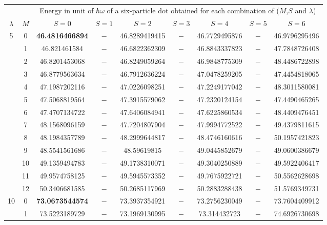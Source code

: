 \begin{table}[ht]
\centering      %
{\scriptsize
\begin{tabular}{c|c|c|c|c|c|c|c|c}  %
\toprule[1pt]
\multicolumn{1}{c|}{ } & \multicolumn{1}{c|}{ } &\multicolumn{7}{c}{Energy in unit of $\hbar \omega$ of a six-particle dot obtained for each combination of ($M$,$S$ and $\lambda$)} \\
$\lambda$ & $M$ & $S=0$& $S=1$ & $S=2$ & $S=3$ & $S=4$ & $S=5$ & $S=6$  \\
\hline                    %
\hline                    %
\multirow{13}{*}{5} & 0 & \textbf{46.4816466894}& $-$& 46.8289419415& $-$& 46.7729495876& $-$& 46.9796295496\\ 
& 1 & 46.821461584& $-$& 46.6822362309& $-$& 46.8843337823& $-$& 47.7848726408\\ 
& 2 & 46.8201453068& $-$& 46.8249059264& $-$& 46.9848775309& $-$& 48.4486722898\\ 
& 3 & 46.8779563634& $-$& 46.7912636224& $-$& 47.0478259205& $-$& 47.4454818065\\ 
& 4 & 47.1987202116& $-$& 47.0226098251& $-$& 47.2249177042& $-$& 48.3011580081\\ 
& 5 & 47.5068819564& $-$& 47.3915579062& $-$& 47.2320124154& $-$& 47.4490465265\\ 
& 6 & 47.4707134722& $-$& 47.6406084941& $-$& 47.6225860534& $-$& 48.4409476451\\ 
& 7 & 48.1568096159& $-$& 47.7204807904& $-$& 47.9994772522& $-$& 49.4379811615\\ 
& 8 & 48.1984357789& $-$& 48.2999644817& $-$& 48.4746160616& $-$& 50.1957421823\\ 
& 9 & 48.5541561686& $-$& 48.59619815& $-$& 49.0445852679& $-$& 49.0600386679\\ 
& 10 & 49.1359494783& $-$& 49.1738310071& $-$& 49.3040250889& $-$& 49.5922406417\\ 
& 11 & 49.9574758125& $-$& 49.5945573352& $-$& 49.7675922721& $-$& 50.5562628698\\ 
& 12 & 50.3406681585& $-$& 50.2685117969& $-$& 50.2883288438& $-$& 51.5769349731\\ 
\hline                    %
\multirow{13}{*}{10} & 0 & \textbf{73.0673544574}& $-$& 73.3937354921& $-$& 73.2756230049& $-$& 73.7604409912\\ 
& 1 & 73.5223189729& $-$& 73.1969130995& $-$& 73.314432723& $-$& 74.6926730698\\ 

\end{tabular}}
\end{table}
